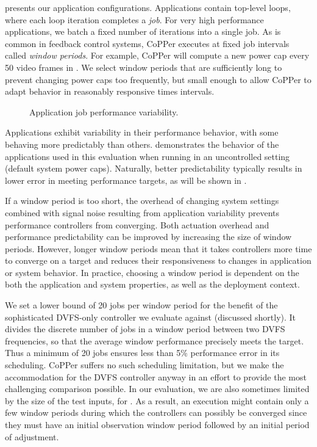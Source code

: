  presents our application configurations.
Applications contain top-level loops, where each loop iteration completes a \emph{job}.
For very high performance applications, we batch a fixed number of iterations into a single job.
As is common in feedback control systems, CoPPer executes at fixed job intervals called \emph{window periods}.
For example, CoPPer will compute a new power cap every 50 video frames in .
We select window periods that are sufficiently long to prevent changing power caps too frequently, but small enough to allow CoPPer to adapt behavior in reasonably responsive times intervals.

\begin{figure}[tb]
  
  \caption{Application job performance variability.}
  \label{fig:copper-variation}
\end{figure}

Applications exhibit variability in their performance behavior, with some behaving more predictably than others.
 demonstrates the behavior of the applications used in this evaluation when running in an uncontrolled setting (default system power caps).
Naturally, better predictability typically results in lower error in meeting performance targets, as will be shown in .

If a window period is too short, the overhead of changing system settings combined with signal noise resulting from application variability prevents performance controllers from converging.
Both actuation overhead and performance predictability can be improved by increasing the size of window periods.
However, longer window periods mean that it takes controllers more time to converge on a target and reduces their responsiveness to changes in application or system behavior.
In practice, choosing a window period is dependent on the both the application and system properties, as well as the deployment context.

We set a lower bound of 20 jobs per window period for the benefit of the sophisticated DVFS-only controller we evaluate against (discussed shortly).
It divides the discrete number of jobs in a window period between two DVFS frequencies, so that the average window performance precisely meets the target.
Thus a minimum of 20 jobs ensures less than 5\% performance error in its scheduling.
CoPPer suffers no such scheduling limitation, but we make the accommodation for the DVFS controller anyway in an effort to provide the most challenging comparison possible.
In our evaluation, we are also sometimes limited by the size of the test inputs, \eg for .
As a result, an execution might contain only a few window periods during which the controllers can possibly be converged since they must have an initial observation window period followed by an initial period of adjustment.


